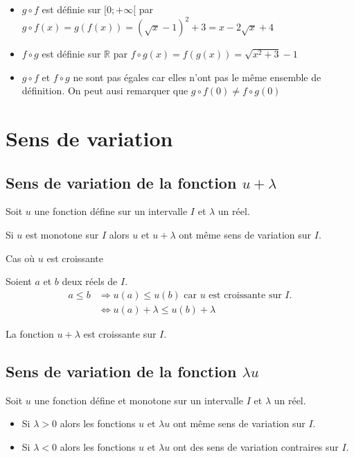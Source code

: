 \documentclass[french]{book}
\newcommand{\R}{\mathbb {R}}
\newcommand{\ie}{\leq}
\begin{document}
\begin{itemize}
\item $g \circ f$ est définie sur $[0;+\infty[$ par $g \circ f(x)=g(f(x))=(\sqrt{x}-1)^{2}+3=x-2\sqrt{x}+4$
\item $f \circ g$ est définie sur $\R$ par $f \circ g(x)=f(g(x))=\sqrt{x^{2}+3}-1$
\item $g \circ f$ et $f \circ g$ ne sont pas égales car elles n'ont pas le même ensemble de définition.
On peut ausi remarquer que $g \circ f(0) \neq f \circ g(0)$
\end{itemize}

\section{Sens de variation}
\subsection{Sens de variation de la fonction $u+\lambda$}
\begin{prop}
Soit $u$ une fonction défine sur un intervalle $I$ et $\lambda$ un réel.

Si $u$ est monotone sur $I$ alors $u$ et $u+\lambda$ ont même sens de variation sur $I$.
\end{prop}


\begin{demo}
Cas où $u$ est croissante

Soient $a$ et $b$ deux réels de $I$.
\begin{align*}
 a \ie b &\Longrightarrow u(a) \ie u(b) \text{ car $u$ est croissante sur $I$.}\\
  &\Longleftrightarrow u(a)+\lambda \ie u(b)+\lambda
\end{align*}

La fonction $u+\lambda$ est croissante sur $I$.

\end{demo}
%
\subsection{Sens de variation de la fonction $\lambda u$}
\begin{prop}
Soit $u$ une fonction défine et monotone sur un intervalle $I$ et $\lambda$ un réel.
\begin{itemize}
\item Si $\lambda >0$ alors les fonctions $u$ et $\lambda u$ ont même sens de variation sur $I$.
\item Si $\lambda <0$ alors les fonctions $u$ et $\lambda u$ ont des sens de variation contraires sur $I$.
\end{itemize}
\end{prop}
\end{document}
